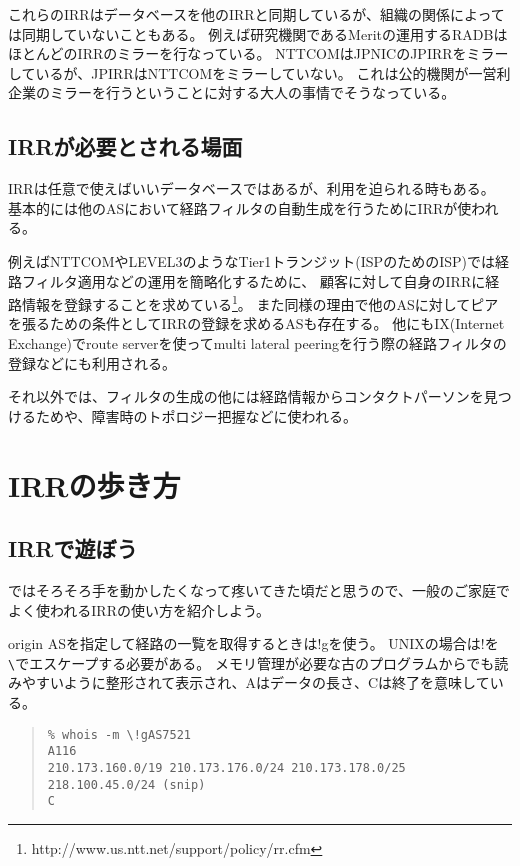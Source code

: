 これらのIRRはデータベースを他のIRRと同期しているが、組織の関係によっては同期していないこともある。
例えば研究機関であるMeritの運用するRADBはほとんどのIRRのミラーを行なっている。
NTTCOMはJPNICのJPIRRをミラーしているが、JPIRRはNTTCOMをミラーしていない。
これは公的機関が一営利企業のミラーを行うということに対する大人の事情でそうなっている。

\subsection{IRRが必要とされる場面}

IRRは任意で使えばいいデータベースではあるが、利用を迫られる時もある。
基本的には他のASにおいて経路フィルタの自動生成を行うためにIRRが使われる。

例えばNTTCOMやLEVEL3のようなTier1トランジット(ISPのためのISP)では経路フィルタ適用などの運用を簡略化するために、
顧客に対して自身のIRRに経路情報を登録することを求めている\footnote{http://www.us.ntt.net/support/policy/rr.cfm}。
また同様の理由で他のASに対してピアを張るための条件としてIRRの登録を求めるASも存在する。
他にもIX(Internet Exchange)でroute serverを使ってmulti lateral peeringを行う際の経路フィルタの登録などにも利用される。

それ以外では、フィルタの生成の他には経路情報からコンタクトパーソンを見つけるためや、障害時のトポロジー把握などに使われる。

\section{IRRの歩き方}

\subsection{IRRで遊ぼう}
ではそろそろ手を動かしたくなって疼いてきた頃だと思うので、一般のご家庭でよく使われるIRRの使い方を紹介しよう。

origin ASを指定して経路の一覧を取得するときは!gを使う。
UNIXの場合は!を\verb+\+でエスケープする必要がある。
メモリ管理が必要な古のプログラムからでも読みやすいように整形されて表示され、Aはデータの長さ、Cは終了を意味している。

\begin{quote}
\begin{minilinespace}
\begin{verbatim}
% whois -m \!gAS7521
A116
210.173.160.0/19 210.173.176.0/24 210.173.178.0/25 218.100.45.0/24 (snip)
C
\end{verbatim}
\end{minilinespace}
\end{quote}

